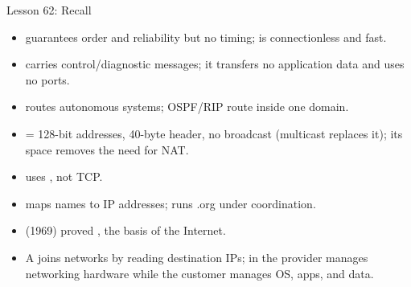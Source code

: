 \documentclass[aspectratio=169]{beamer}
\begin{document}
\begin{frame}{Lesson 62: Recall}
  \begin{itemize}
    \item {} guarantees order and reliability but no timing; 
      is connectionless and fast.
    \item {} carries control/diagnostic messages; it transfers no
      application data and uses no ports.
    \item {} routes  autonomous systems; OSPF/RIP route
      inside one domain.
    \item {} = 128-bit addresses, 40-byte header, no broadcast
      (multicast replaces it); its space removes the need for NAT.
    \item {} uses , not TCP.
    \item {} maps names to IP addresses;  runs .org under
       coordination.
    \item {} (1969) proved , the basis of the
      Internet.
    \item A  joins networks by reading destination IPs; in
       the provider manages networking hardware while the customer
      manages OS, apps, and data.
  \end{itemize}
\end{frame}
\end{document}
